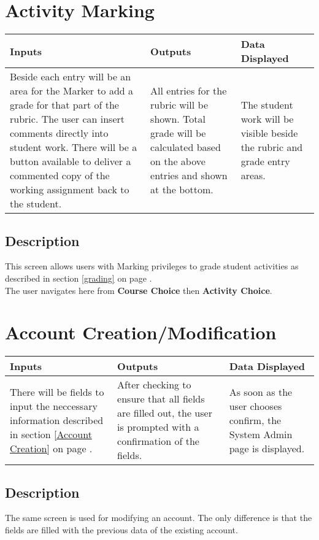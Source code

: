\documentclass{article}
\begin{document}
\section{Activity Marking}
\begin{tabular}{| p{5cm} | p{5cm} | p{5cm} |}
	\hline
	Inputs & Outputs & Data Displayed \\ \hline
	Beside each entry will be an
	area for the Marker to add a grade for that part of the rubric.
	The user can insert comments directly into student work.
	There will be a button available to deliver a commented copy of the working
assignment back to the student.
	& All entries for the rubric will be shown.
Total grade will be calculated based on the above entries and shown at the
bottom.
	& The student work will be visible beside the rubric and grade entry areas.
	
	\\ \hline
\end{tabular}

\subsection{Description}
This screen allows users with Marking privileges to grade student activities
as described in section \ref{grading} on page \pageref{grading}.\\
The user navigates here from \textbf{Course Choice} then \textbf{Activity Choice}.

\section{Account Creation/Modification}
\begin{tabular}{| p{5cm} | p{5cm} | p{5cm} |}
	\hline
	Inputs & Outputs & Data Displayed \\ \hline
	There will be fields to input the neccessary information described
in section \ref{Account Creation} on page \pageref{Account Creation}.
	& After checking to ensure that all fields are filled out, the user is 
	prompted with a confirmation of the fields. 
	& As soon as the user chooses confirm, the System Admin page is displayed.
	
	\\ \hline
\end{tabular}

\subsection{Description}
The same screen is used for modifying an account. The only difference is
that the fields are filled with the previous data of the existing account.
\end{document}
